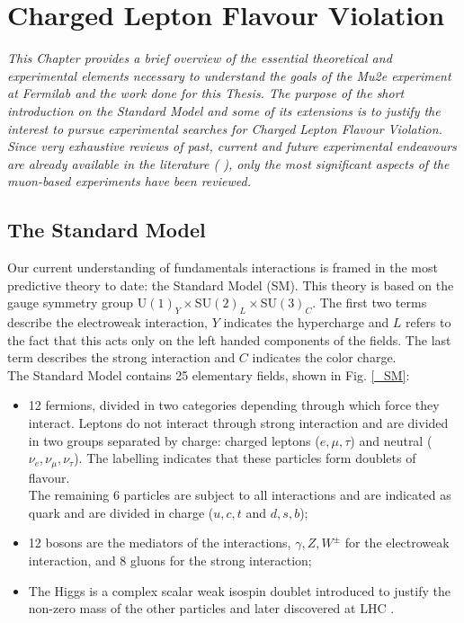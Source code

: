 \documentclass[12pt,a4paper,openright, oneside, titlepage]{book} %
\begin{document}
\chapter{Charged Lepton Flavour Violation}

{\itshape 
This Chapter provides a brief overview of the essential theoretical and experimental elements
necessary to understand the goals of the Mu2e experiment at Fermilab and the work done
for this Thesis. 
The purpose of the short introduction on the Standard Model and some of its extensions 
is to justify the interest to pursue experimental searches for Charged Lepton Flavour Violation. 
Since very exhaustive reviews of past, current and future experimental endeavours 
are already available in the literature (\cite{signorelli} \cite{bob_cflv}), 
only the most significant aspects of the muon-based experiments have been reviewed.} 

\section{The Standard Model}
Our current understanding of fundamentals interactions is framed 
in the most predictive theory to date: the Standard Model (SM). 
This theory is based on the gauge symmetry group U$(1)_Y \times $SU$(2)_L\times $SU$(3)_C$. 
The first two terms describe the electroweak interaction, 
$Y$ indicates the hypercharge and  
$L$ refers to the fact that this acts only on the left handed components of the fields. 
The last term describes the strong interaction and $C$ indicates the color charge.\\
The Standard Model contains 25 elementary fields, shown in Fig. \ref{_SM}: 
\begin{itemize}
\item 12 fermions, divided in two categories depending through which force they interact.
Leptons do not interact through strong interaction 
and are divided in two groups separated by charge: 
charged leptons ($e,\mu,\tau$) and neutral ($\nu_e,\nu_\mu,\nu_\tau$). 
The labelling indicates that these particles form doublets of flavour.\\
The remaining 6 particles are subject to all interactions 
and are indicated as quark and are divided in charge ($u,c,t$ and $d,s,b$);
\item 12 bosons are the mediators of the interactions, 
$\gamma,Z,W^\pm$ for the electroweak interaction, 
and 8 gluons for the strong interaction;
\item The Higgs is a complex scalar weak isospin doublet introduced 
to justify the non-zero mass of the other particles and later discovered at LHC \cite{H:CMS}\cite{H:ATLAS}.
\end{itemize}
\end{document}
